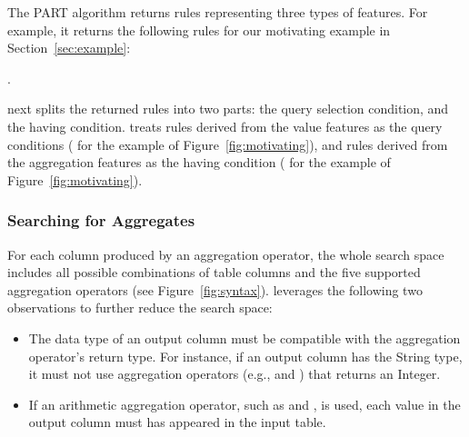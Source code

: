 

The PART algorithm returns rules representing three types of features.
For example, it returns the following rules for our motivating example in Section~\ref{sec:example}:

\smallskip
{
}

.

\ourtool next splits the returned rules into two parts: the query selection
condition, and the having condition. 
\ourtool treats rules derived from the value features
as the query conditions (
for the example of Figure~\ref{fig:motivating}),
and rules derived from
the aggregation features as the having condition (
for the example of Figure~\ref{fig:motivating}). 




\subsubsection{Searching for Aggregates}
\label{sec:agg_search}

For each column produced by an aggregation operator,
the whole search space includes all possible combinations
of table columns and the five supported aggregation operators (see Figure~\ref{fig:syntax}).
\ourtool leverages the following two observations to
further reduce the search space:

\begin{itemize}
\item The data type of an output column must be compatible with the
aggregation operator's return type. For instance, if an output column
has the String type, it must not use aggregation operators (e.g.,
 and ) that returns
an Integer. 

\item If an arithmetic aggregation operator, such as  and ,
is used, each value in the output column must has appeared in the input table.
\end{itemize}

